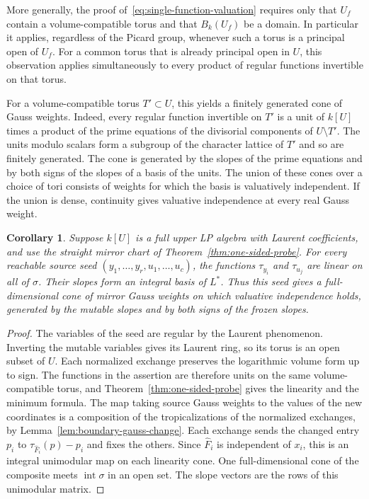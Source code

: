 \documentclass[11pt,reqno]{amsart}
\numberwithin{equation}{section}
\newtheorem{corollary}[theorem]{Corollary}
\theoremstyle{definition}
\theoremstyle{remark}
\begin{document}
More generally, the proof of~\eqref{eq:single-function-valuation} requires only that
\(U_f\) contain a volume-compatible torus and that \(B_k(U_f)\)
be a domain. In particular it applies, regardless of the Picard
group, whenever such a torus is a principal open of \(U_f\).
For a common torus that is already principal open in \(U\), this
observation applies simultaneously to every product of regular
functions invertible on that torus.

For a volume-compatible torus \(T'\subset U\), this yields a finitely
generated cone of Gauss weights. Indeed, every regular function
invertible on \(T'\) is a unit of \(k[U]\) times a product of the prime
equations of the divisorial components of \(U\setminus T'\).
The units modulo scalars form a subgroup of the character lattice of
\(T'\) and so are finitely generated. The cone is generated by the
slopes of the prime equations and by both signs of the slopes of a
basis of the units. The union of these cones over a choice of tori
consists of weights for which the basis is valuatively independent.
If the union is dense, continuity gives valuative independence at
every real Gauss weight.

\begin{corollary}\label{cor:source-seed-slopes}
Suppose \(k[U]\) is a full upper LP algebra with Laurent coefficients,
and use the straight mirror chart of Theorem~\ref{thm:one-sided-probe}.
For every reachable source seed \((y_1,\ldots,y_r,u_1,\ldots,u_c)\),
the functions \(\tau_{y_i}\) and \(\tau_{u_j}\) are linear on all of
\(\sigma\). Their slopes form an integral basis of \(L^*\). Thus this
seed gives a full-dimensional cone of mirror Gauss weights on which
valuative independence holds, generated by the mutable slopes and by
both signs of the frozen slopes.
\end{corollary}
\begin{proof}
The variables of the seed are regular by the Laurent phenomenon.
Inverting the mutable variables gives its Laurent ring, so its torus
is an open subset of \(U\). Each normalized exchange preserves the
logarithmic volume form up to sign. The functions in the assertion
are therefore units on the same volume-compatible torus, and
Theorem~\ref{thm:one-sided-probe} gives the linearity and the
minimum formula. The map taking source Gauss weights to the values
of the new coordinates is a composition of the tropicalizations of
the normalized exchanges, by Lemma~\ref{lem:boundary-gauss-change}.
Each exchange sends the changed entry \(p_i\) to
\(\tau_{\widehat F_i}(p)-p_i\) and fixes the others. Since
\(\widehat F_i\) is independent of \(x_i\), this is an integral
unimodular map on each linearity cone. One full-dimensional cone of
the composite meets \(\operatorname{int}\sigma\) in an open set.
The slope vectors are the rows of this unimodular matrix.
\end{proof}
\end{document}

